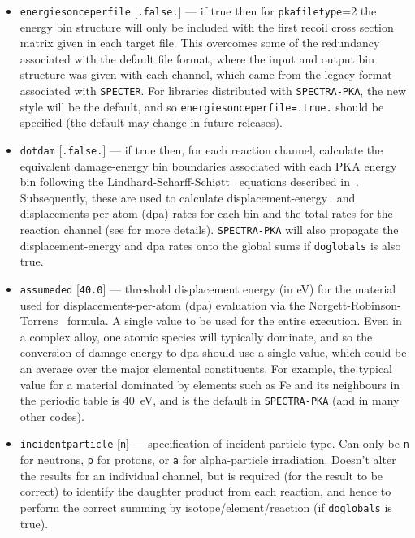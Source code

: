 \documentclass[a4paper]{article}
\begin{document}
\begin{itemize}
\item \texttt{energies{\textunderscore}once{\textunderscore}perfile} [\texttt{.false.}] --- if true then for   \texttt{pka{\textunderscore}filetype}=2 the energy bin structure will only be included with the first recoil cross section matrix given in each target file. This overcomes some of the redundancy associated with the default file format, where the input and output bin structure was given with each channel, which came from the legacy format associated with \texttt{SPECTER}. For libraries distributed with \texttt{SPECTRA-PKA}, the new style will be the default, and so \texttt{energies{\textunderscore}once{\textunderscore}perfile=.true.} should be specified (the default may change in future releases).
\item \texttt{do{\textunderscore}tdam} [\texttt{.false.}] --- if true then, for each reaction channel, calculate the equivalent damage-energy bin boundaries associated with each PKA energy bin following the Lindhard-Scharff-Schi{\o}tt~\cite{lindardetal1963a} equations described in~\cite{gilbertsublet2018,robinson1994}. Subsequently, these are used to calculate displacement-energy~\cite{AdrychBrunning2018} and displacements-per-atom (dpa) rates for each bin and the total rates for the reaction channel (see \cite{gilbertsublet2018} for more details). \texttt{SPECTRA-PKA} will also propagate the displacement-energy and dpa rates onto the global sums if \texttt{do{\textunderscore}globals} is also true.
\item \texttt{assumed{\textunderscore}ed} [\texttt{40.0}] --- threshold displacement energy (in eV) for the material used for displacements-per-atom (dpa) evaluation via the Norgett-Robinson-Torrens~\cite{norgettetal1975} formula. A single value to be used for the entire execution. Even in a complex alloy, one atomic species will typically dominate, and so the conversion of damage energy to dpa should use a single value, which could be an average over the major elemental constituents. For example, the typical value for a material dominated by elements such as Fe and its neighbours in the periodic table is 40~eV, and is the default in \texttt{SPECTRA-PKA} (and in many other codes).
\item \texttt{incident{\textunderscore}particle} [\texttt{n}] --- specification of incident particle type. Can only be \texttt{n} for neutrons, \texttt{p} for protons, or \texttt{a} for alpha-particle irradiation. Doesn't alter the results for an individual channel, but is required (for the result to be correct) to identify the daughter product from each reaction, and hence to perform the correct summing by isotope/element/reaction (if \texttt{do{\textunderscore}globals} is true).

\end{itemize}
\end{document}
